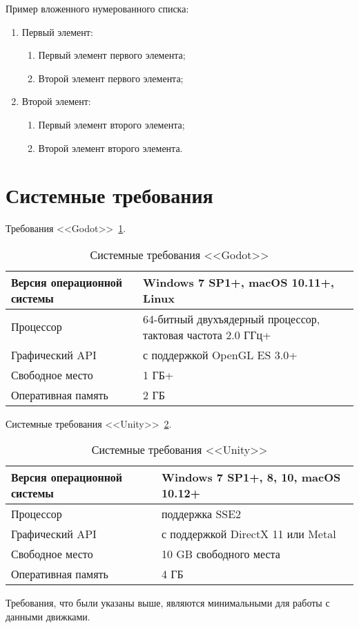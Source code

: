 Пример вложенного нумерованного списка:
\begin{enumerate}
\item Первый элемент:
\begin{enumerate}
\item Первый элемент первого элемента;
\item Второй элемент первого элемента;
\end{enumerate}
\item Второй элемент:
\begin{enumerate}
\item Первый элемент второго элемента;
\item Второй элемент второго элемента.
\end{enumerate}
\end{enumerate}

\section{\label{sec:ch01/sec03}Системные требования }

Требования <<Godot>>~\ref{tab:example01}.
\begin{table}[H]
\caption{\centering\label{tab:example01}Системные требования <<Godot>>}
\begin{tabular}{|p{3 cm}|p{5 cm}|}
\hline
Версия операционной системы & Windows 7 SP1+, macOS 10.11+, Linux \\ \hline
Процессор & 64-битный двухъядерный процессор, тактовая частота 2.0 ГГц+ \\ \hline
Графический API & с поддержкой OpenGL ES 3.0+ \\ \hline
Свободное место & 1 ГБ+ \\ \hline
Оперативная память & 2 ГБ \\ \hline
\end{tabular}
\end{table}

Системные требования <<Unity>>~\ref{tab:example02}.
\begin{table}[H]
\caption{\centering\label{tab:example02}Системные требования <<Unity>>}
\begin{tabular}{|p{3 cm}|p{5 cm}|}
\hline
Версия операционной системы & Windows 7 SP1+, 8, 10, macOS 10.12+ \\ \hline
Процессор & поддержка SSE2 \\ \hline
Графический API & с поддержкой DirectX 11 или Metal \\ \hline
Свободное место & 10 GB свободного места \\ \hline
Оперативная память & 4 ГБ \\ \hline
\end{tabular}
\end{table}
\par
Требования, что были указаны выше, являются минимальными для работы с данными движками.